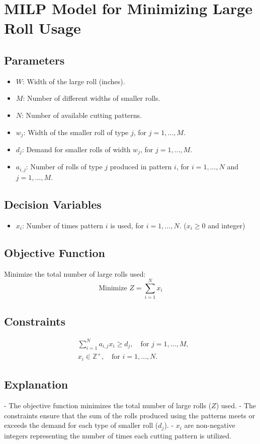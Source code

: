 \documentclass{article}
\begin{document}
\section*{MILP Model for Minimizing Large Roll Usage}

\subsection*{Parameters}
\begin{itemize}
    \item $W$: Width of the large roll (inches).
    \item $M$: Number of different widths of smaller rolls.
    \item $N$: Number of available cutting patterns.
    \item $w_j$: Width of the smaller roll of type $j$, for $j = 1, \ldots, M$.
    \item $d_j$: Demand for smaller rolls of width $w_j$, for $j = 1, \ldots, M$.
    \item $a_{i,j}$: Number of rolls of type $j$ produced in pattern $i$, for $i = 1, \ldots, N$ and $j = 1, \ldots, M$.
\end{itemize}

\subsection*{Decision Variables}
\begin{itemize}
    \item $x_i$: Number of times pattern $i$ is used, for $i = 1, \ldots, N$. ($x_i \geq 0$ and integer)
\end{itemize}

\subsection*{Objective Function}
Minimize the total number of large rolls used:
\[
\text{Minimize } Z = \sum_{i=1}^{N} x_i
\]

\subsection*{Constraints}
\begin{align}
    & \sum_{i=1}^{N} a_{i,j} x_i \geq d_j, \quad \text{for } j = 1, \ldots, M, \\
    & x_i \in \mathbb{Z}^+, \quad \text{for } i = 1, \ldots, N.
\end{align}

\subsection*{Explanation}
- The objective function minimizes the total number of large rolls ($Z$) used.
- The constraints ensure that the sum of the rolls produced using the patterns meets or exceeds the demand for each type of smaller roll ($d_j$).
- $x_i$ are non-negative integers representing the number of times each cutting pattern is utilized.
\end{document}
